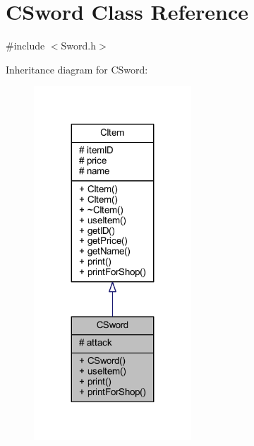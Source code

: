 \hypertarget{class_c_sword}{}\section{C\+Sword Class Reference}
\label{class_c_sword}


{\ttfamily \#include $<$Sword.\+h$>$}



Inheritance diagram for C\+Sword\+:\nopagebreak
\begin{figure}[H]
\begin{center}
\leavevmode
\includegraphics[width=167pt]{class_c_sword__inherit__graph}
\end{center}
\end{figure}


